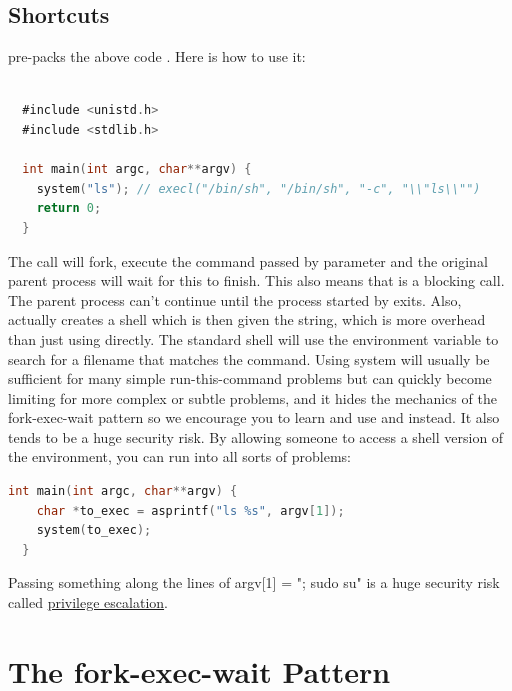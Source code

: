\begin{itemize}
\subsection{Shortcuts}

 pre-packs the above code \cite[P. 371]{jones2010wg14}. Here is how to use it:

\begin{lstlisting}[language=C]

  #include <unistd.h>
  #include <stdlib.h>

  int main(int argc, char**argv) {
    system("ls"); // execl("/bin/sh", "/bin/sh", "-c", "\\"ls\\"")
    return 0;
  }
\end{lstlisting}

The  call will fork, execute the command passed by parameter and the original parent process will wait for this to finish.
This also means that  is a blocking call.
The parent process can't continue until the process started by  exits.
Also,  actually creates a shell which is then given the string, which is more overhead than just using  directly.
The standard shell will use the  environment variable to search for a filename that matches the command.
Using system will usually be sufficient for many simple run-this-command problems but can quickly become limiting for more complex or subtle problems, and it hides the mechanics of the fork-exec-wait pattern so we encourage you to learn and use   and  instead.
It also tends to be a huge security risk.
By allowing someone to access a shell version of the environment, you can run into all sorts of problems:

\begin{lstlisting}[language=C]
  int main(int argc, char**argv) {
    char *to_exec = asprintf("ls %s", argv[1]);
    system(to_exec);
  }
\end{lstlisting}

Passing something along the lines of argv[1] = "; sudo su" is a huge security risk called \href{https://en.wikipedia.org/wiki/Privilege\_escalation}{privilege escalation}.

\section{The fork-exec-wait Pattern}


\end{itemize}

